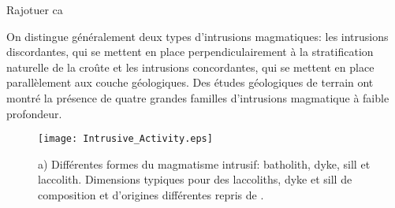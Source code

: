 Rajotuer ca

On  distingue généralement  deux types  d'intrusions magmatiques:  les
intrusions discordantes, qui se mettent en place perpendiculairement à
la   stratification  naturelle   de  la   croûte  et   les  intrusions
concordantes,  qui  se  mettent  en  place  parallèlement  aux  couche
géologiques. Des études géologiques de  terrain ont montré la présence
de   quatre  grandes   familles  d'intrusions   magmatique  à   faible
profondeur.

\begin{figure}[h!]
  \begin{center}
    \graphicspath{ {/Users/thorey/Documents/These/Manuscript/Figure/Chapter1/} }
    \texttt{[image: Intrusive\_Activity.eps]}
    \caption{a) Différentes formes  du magmatisme intrusif: batholith,
      dyke,  sill   et  laccolith.    Dimensions  typiques   pour  des
      laccoliths,   dyke  et   sill  de   composition  et   d'origines
      différentes repris de \citet{Cruden:tg}. }
    \label{Dimension}
  \end{center}
\end{figure}

